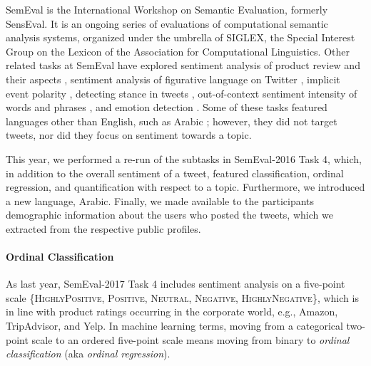 \documentclass[11pt,a4paper]{article}
\begin{document}
\noindent SemEval is the International Workshop on Semantic Evaluation, formerly SensEval.
It is an ongoing series of evaluations of computational semantic analysis systems, organized under the umbrella of SIGLEX, the Special Interest Group on the Lexicon of the Association for Computational Linguistics.
Other related tasks at SemEval have explored sentiment analysis of product review and their aspects \cite{pontiki2014semeval,pontiki2015semeval,pontiki2016semeval}, sentiment analysis of figurative language on Twitter \cite{ghosh2015semeval}, implicit event polarity \cite{russo2015semeval}, detecting stance in tweets \cite{mohammad2016semeval}, out-of-context sentiment intensity of words and phrases \cite{kiritchenko2016semeval}, and emotion detection \cite{strapparava2007semeval}. Some of these tasks featured languages other than English, such as Arabic \cite{pontiki2016semeval,mohammad2016semeval}; however, they did not target tweets, nor did they focus on sentiment towards a topic. 
  
This year, we performed a re-run of the subtasks in SemEval-2016 Task 4, which, in addition to the overall sentiment of a tweet, featured classification, ordinal regression, and quantification with respect to a topic. Furthermore, we introduced a new language, Arabic.
Finally, we made available to the participants demographic information about the users who posted the tweets, which we extracted from the respective public profiles.


\paragraph{Ordinal Classification}
As last year, SemEval-2017 Task 4 includes sentiment analysis on a
  five-point scale \{\textsc{HighlyPositive}, \textsc{Positive},
  \textsc{Neutral}, \textsc{Negative}, \textsc{HighlyNegative}\}, which is in line with product ratings occurring in the corporate world, e.g., Amazon, TripAdvisor, and Yelp.
In machine learning terms, moving from a categorical two-point scale to an ordered five-point scale means moving from binary to \emph{ordinal classification} (aka \textit{ordinal regression}).
  
\end{document}
